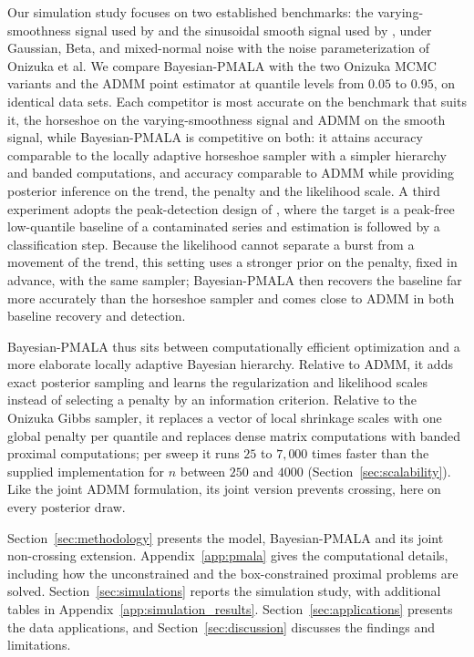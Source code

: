 Our simulation study focuses on two established benchmarks: the varying-smoothness signal used by \citet{onizuka2024fast} and the sinusoidal smooth signal used by \citet{brantley2020baseline}, under Gaussian, Beta, and mixed-normal noise with the noise parameterization of Onizuka et al. We compare Bayesian-PMALA with the two Onizuka MCMC variants and the ADMM point estimator at quantile levels from $0.05$ to $0.95$, on identical data sets. Each competitor is most accurate on the benchmark that suits it, the horseshoe on the varying-smoothness signal and ADMM on the smooth signal, while Bayesian-PMALA is competitive on both: it attains accuracy comparable to the locally adaptive horseshoe sampler with a simpler hierarchy and banded computations, and accuracy comparable to ADMM while providing posterior inference on the trend, the penalty and the likelihood scale. A third experiment adopts the peak-detection design of \citet{brantley2020baseline}, where the target is a peak-free low-quantile baseline of a contaminated series and estimation is followed by a classification step. Because the likelihood cannot separate a burst from a movement of the trend, this setting uses a stronger prior on the penalty, fixed in advance, with the same sampler; Bayesian-PMALA then recovers the baseline far more accurately than the horseshoe sampler and comes close to ADMM in both baseline recovery and detection.

Bayesian-PMALA thus sits between computationally efficient optimization and a more elaborate locally adaptive Bayesian hierarchy. Relative to ADMM, it adds exact posterior sampling and learns the regularization and likelihood scales instead of selecting a penalty by an information criterion. Relative to the Onizuka Gibbs sampler, it replaces a vector of local shrinkage scales with one global penalty per quantile and replaces dense matrix computations with banded proximal computations; per sweep it runs $25$ to $7{,}000$ times faster than the supplied implementation for $n$ between $250$ and $4000$ (Section~\ref{sec:scalability}). Like the joint ADMM formulation, its joint version prevents crossing, here on every posterior draw.

Section~\ref{sec:methodology} presents the model, Bayesian-PMALA and its joint non-crossing extension. Appendix~\ref{app:pmala} gives the computational details, including how the unconstrained and the box-constrained proximal problems are solved. Section~\ref{sec:simulations} reports the simulation study, with additional tables in Appendix~\ref{app:simulation_results}. Section~\ref{sec:applications} presents the data applications, and Section~\ref{sec:discussion} discusses the findings and limitations.
